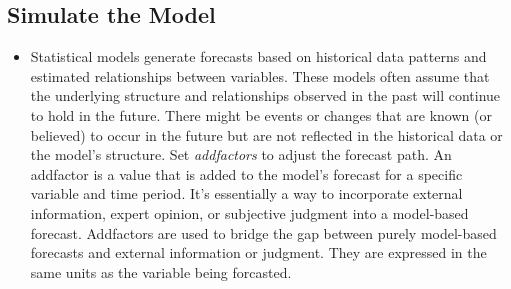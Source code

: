 \documentclass[
  letterpaper,
  DIV=11,
  numbers=noendperiod]{scrreport}
\newenvironment{Shaded}{\begin{snugshade}}{\end{snugshade}}
\newcommand{\AttributeTok}[1]{\textcolor[rgb]{0.40,0.45,0.13}{#1}}
\newcommand{\CommentTok}[1]{\textcolor[rgb]{0.37,0.37,0.37}{#1}}
\newcommand{\DecValTok}[1]{\textcolor[rgb]{0.68,0.00,0.00}{#1}}
\newcommand{\FloatTok}[1]{\textcolor[rgb]{0.68,0.00,0.00}{#1}}
\newcommand{\FunctionTok}[1]{\textcolor[rgb]{0.28,0.35,0.67}{#1}}
\newcommand{\NormalTok}[1]{\textcolor[rgb]{0.00,0.23,0.31}{#1}}
\newcommand{\OtherTok}[1]{\textcolor[rgb]{0.00,0.23,0.31}{#1}}
\newcommand{\SpecialCharTok}[1]{\textcolor[rgb]{0.37,0.37,0.37}{#1}}
\newcommand{\StringTok}[1]{\textcolor[rgb]{0.13,0.47,0.30}{#1}}
\providecommand{\tightlist}{%
  \setlength{\itemsep}{0pt}\setlength{\parskip}{0pt}}\usepackage{longtable,booktabs,array}
\begin{document}
\subsection{Simulate the Model}\label{simulate-the-model}

\begin{itemize}
\tightlist
\item
  Statistical models generate forecasts based on historical data
  patterns and estimated relationships between variables. These models
  often assume that the underlying structure and relationships observed
  in the past will continue to hold in the future. There might be events
  or changes that are known (or believed) to occur in the future but are
  not reflected in the historical data or the model's structure. Set
  \emph{addfactors} to adjust the forecast path. An addfactor is a value
  that is added to the model's forecast for a specific variable and time
  period. It's essentially a way to incorporate external information,
  expert opinion, or subjective judgment into a model-based forecast.
  Addfactors are used to bridge the gap between purely model-based
  forecasts and external information or judgment. They are expressed in
  the same units as the variable being forcasted.
\end{itemize}

\begin{Shaded}
\end{Shaded}
\end{document}
